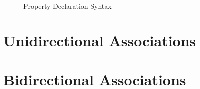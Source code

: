 
\begin{figure}
\verbatimfont{\small}
\begin{framed}

\end{framed}
\caption{Property Declaration Syntax}
\label{fig:property-syntax}
\end{figure}

\section{Unidirectional Associations}\label{sec:assoc-unidir}

\section{Bidirectional Associations}\label{sec:assoc-bidir}

